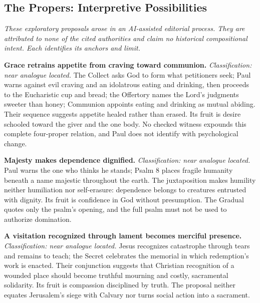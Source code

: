 \begin{deepstudy}


\sectionguard
\section*{The Propers: Interpretive Possibilities}

\noindent\emph{These exploratory proposals arose in an AI-assisted editorial process. They are attributed to none of the cited authorities and claim no historical compositional intent. Each identifies its anchors and limit.}

\noindent\textbf{Grace retrains appetite from craving toward communion.\enspace{}}
\emph{Classification: near analogue located.} The Collect asks God to form what petitioners seek; Paul warns against evil craving and an idolatrous eating and drinking, then proceeds to the Eucharistic cup and bread; the Offertory names the Lord's judgments sweeter than honey; Communion appoints eating and drinking as mutual abiding. Their sequence suggests appetite healed rather than erased. Its fruit is desire schooled toward the giver and the one body. No checked witness expounds this complete four-proper relation, and Paul does not identify  with psychological change.

\noindent\textbf{Majesty makes dependence dignified.\enspace{}}
\emph{Classification: near analogue located.} Paul warns the one who thinks he stands; Psalm 8 places fragile humanity beneath a name majestic throughout the earth. The juxtaposition makes humility neither humiliation nor self-erasure: dependence belongs to creatures entrusted with dignity. Its fruit is confidence in God without presumption. The Gradual quotes only the psalm's opening, and the full psalm must not be used to authorize domination.

\noindent\textbf{A visitation recognized through lament becomes merciful presence.\enspace{}}
\emph{Classification: near analogue located.} Jesus recognizes catastrophe through tears and remains to teach; the Secret celebrates the memorial in which redemption's work is enacted. Their conjunction suggests that Christian recognition of a wounded place should become truthful mourning and costly, sacramental solidarity. Its fruit is compassion disciplined by truth. The proposal neither equates Jerusalem's siege with Calvary nor turns social action into a sacrament.


\end{deepstudy}
